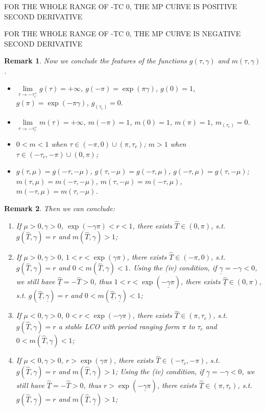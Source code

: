 \documentclass{article}
\newtheorem{remark}{Remark}[theorem]
\begin{document}
FOR THE WHOLE RANGE OF -TC 0, THE MP CURVE IS POSITIVE SECOND DERIVATIVE

FOR THE WHOLE RANGE OF -TC 0, THE MP CURVE IS NEGATIVE SECOND DERIVATIVE 

\begin{remark}
	Now we conclude the features of the functions $g(\tau, \gamma)$ and $m(\tau, \gamma)$.
	\begin{itemize}
		\item[(i)] $\lim\limits_{\tau \to -\tau_c^+} g(\tau) = + \infty$, $g(-\pi) = \exp(\pi \gamma)$, $g(0) = 1$, $g(\pi) = \exp(-\pi \gamma)$, $g_(\tau_c) =0$.
		\item[(ii)] $\lim\limits_{\tau \to -\tau_c^+} m(\tau) = + \infty$, $m(-\pi) = 1$, $m(0) = 1$, $m(\pi) = 1$, $m_(\tau_c) =0$.
		\item[(iii)] $0<m<1$ when $\tau \in (-\pi, 0) \cup (\pi, \tau_c)$;  $m>1$ when $\tau \in (-\tau_c, -\pi) \cup ( 0, \pi)$; 
		\item[(iv)] $g(\tau, \mu) = g(-\tau, -\mu)$, $g(\tau, -\mu) = g(-\tau, \mu)$, $g(-\tau, \mu) = g(\tau, -\mu)$; $m(\tau, \mu) = m(-\tau, -\mu)$, $m(\tau, -\mu) = m(-\tau, \mu)$, $m(-\tau, \mu) = m(\tau, -\mu)$.
	\end{itemize}
\end{remark}
\begin{remark}
	Then we can conclude:
	\begin{enumerate}
		\item If $\mu >0, \gamma>0$, $\exp(-\gamma \pi)< r < 1$, there exists $\hat{T} \in (0,\pi) $, s.t. $g(\hat{T}, \gamma ) = r$  and $m(\hat{T}, \gamma) > 1$;
		
		\item If $\mu >0, \gamma>0$, $1< r < \exp(\gamma \pi)$, there exists $\hat{T} \in (-\pi, 0) $, s.t. $g(\hat{T}, \gamma ) = r$ and $0<m(\hat{T}, \gamma) < 1$.
		 Using the (iv) condition, if $\underline{\gamma} = - \gamma < 0$, we still have $\underline{\hat{T}} = - \hat{T} > 0$, thus $1< r < \exp(-\underline{\gamma} \pi)$, there exists $\underline{\hat{T}} \in (0,\pi) $, s.t. $g(\underline{\hat{T}}, \underline{\gamma} ) = r$ and $0<m(\underline{\hat{T}}, \underline{\gamma}) < 1$;
		
		\item If $\mu <0, \gamma>0$, $0 < r < \exp(-\gamma \pi)$, there exists $\hat{T} \in (\pi, \tau_c) $, s.t. $g(\hat{T}, \gamma ) = r$ a stable LCO with period ranging form $\pi$ to $\tau_c$  and $0<m(\hat{T}, \gamma) < 1$;
		
		\item If $\mu <0, \gamma>0$, $r > \exp(\gamma \pi)$, there exists $\hat{T} \in (-\tau_c, -\pi) $, s.t. $g(\hat{T}, \gamma ) = r$  and $m(\hat{T}, \gamma) > 1$; 
		Using the (iv) condition, if $\underline{\gamma} = - \gamma < 0$, we still have $\underline{\hat{T}} = - \hat{T} > 0$, thus $ r > \exp(-\underline{\gamma} \pi)$, there exists $\underline{\hat{T}} \in (\pi, \tau_c) $, s.t. $g(\underline{\hat{T}}, \underline{\gamma} ) = r$ and $m(\underline{\hat{T}}, \underline{\gamma}) > 1$;
		
	\end{enumerate}
\end{remark}
\end{document}
